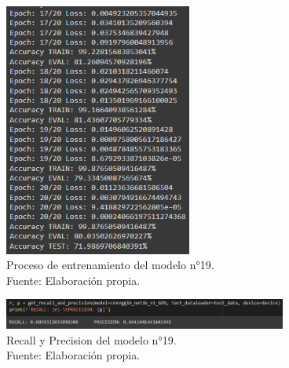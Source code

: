 \begin{figure}[H]
	\begin{center}
		\includegraphics[width=0.55\textwidth]{4/figures/model19_train.PNG}
		\caption[Proceso de entrenamiento del modelo n°19]{Proceso de entrenamiento del modelo n°19. \\
		Fuente: Elaboración propia.}
		\label{4:fig156}
	\end{center}
\end{figure}

\begin{figure}[H]
	\begin{center}
		\includegraphics[width=0.83\textwidth]{4/figures/model19_rp.PNG}
		\caption[Recall y Precision del modelo n°19]{Recall y Precision del modelo n°19. \\
		Fuente: Elaboración propia.}
		\label{4:fig157}
	\end{center}
\end{figure}

